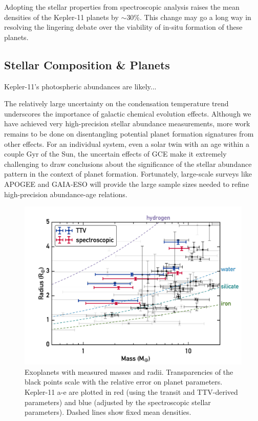 \documentclass[oneside]{emulateapj}
\begin{document}
Adopting the stellar properties from spectroscopic analysis raises the mean densities of the Kepler-11 planets by $\sim$30\%. This change may go a long way in resolving the lingering debate over the viability of in-situ formation of these planets. 

\subsection{Stellar Composition \& Planets}

Kepler-11's photospheric abundances are likely... 

The relatively large uncertainty on the condensation temperature trend underscores the importance of galactic chemical evolution effects. Although we have achieved very high-precision stellar abundance measurements, more work remains to be done on disentangling potential planet formation signatures from other effects. For an individual system, even a solar twin with an age within a couple Gyr of the Sun, the uncertain effects of GCE make it extremely challenging to draw conclusions about the significance of the stellar abundance pattern in the context of planet formation. Fortunately, large-scale surveys like APOGEE and GAIA-ESO will provide the large sample sizes needed to refine high-precision abundance-age relations.

\begin{figure}
\centering
\includegraphics[scale=0.6]{K11_massradius}
\caption{Exoplanets with measured masses and radii. Transparencies of the black points scale with the relative error on planet parameters. Kepler-11 a-e are plotted in red (using the transit and TTV-derived parameters) and blue (adjusted by the spectroscopic stellar parameters). Dashed lines show fixed mean densities.}
\label{fig:mr}
\end{figure}
\end{document}
